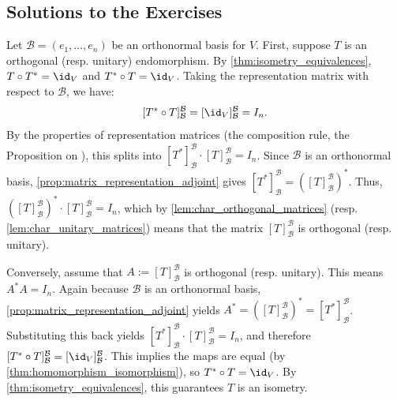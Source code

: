 \subsection{Solutions to the Exercises}
\label{sec:solutions_isometries}

\begin{exercisesolution}
\label{sol:orth_unitary_matrix_rep}
Let $\mathcal{B} = (e_1, \dots, e_n)$ be an orthonormal basis for $V$. 
First, suppose $T$ is an orthogonal (resp. unitary) endomorphism. By \cref{thm:isometry_equivalences}, $T \circ T^* = \id_V$ and $T^* \circ T = \id_V$. 
Taking the representation matrix with respect to $\mathcal{B}$, we have:
\[ [T^* \circ T]_{\mathcal{B}}^{\mathcal{B}} = [\id_V]_{\mathcal{B}}^{\mathcal{B}} = I_n. \]
By the properties of representation matrices (the composition rule, the Proposition on ), this splits into $[T^*]_{\mathcal{B}}^{\mathcal{B}} \cdot [T]_{\mathcal{B}}^{\mathcal{B}} = I_n$. Since $\mathcal{B}$ is an orthonormal basis, \cref{prop:matrix_representation_adjoint} gives $[T^*]_{\mathcal{B}}^{\mathcal{B}} = \left([T]_{\mathcal{B}}^{\mathcal{B}}\right)^*$. 
Thus, $\left([T]_{\mathcal{B}}^{\mathcal{B}}\right)^* \cdot [T]_{\mathcal{B}}^{\mathcal{B}} = I_n$, which by \cref{lem:char_orthogonal_matrices} (resp. \cref{lem:char_unitary_matrices}) means that the matrix $[T]_{\mathcal{B}}^{\mathcal{B}}$ is orthogonal (resp. unitary).

Conversely, assume that $A := [T]_{\mathcal{B}}^{\mathcal{B}}$ is orthogonal (resp. unitary). This means $A^* A = I_n$. 
Again because $\mathcal{B}$ is an orthonormal basis, \cref{prop:matrix_representation_adjoint} yields $A^* = \left([T]_{\mathcal{B}}^{\mathcal{B}}\right)^* = [T^*]_{\mathcal{B}}^{\mathcal{B}}$. 
Substituting this back yields $[T^*]_{\mathcal{B}}^{\mathcal{B}} \cdot [T]_{\mathcal{B}}^{\mathcal{B}} = I_n$, and therefore $[T^* \circ T]_{\mathcal{B}}^{\mathcal{B}} = [\id_V]_{\mathcal{B}}^{\mathcal{B}}$. This implies the maps are equal (by \cref{thm:homomorphism_isomorphism}), so $T^* \circ T = \id_V$. By \cref{thm:isometry_equivalences}, this guarantees $T$ is an isometry.
\end{exercisesolution}

